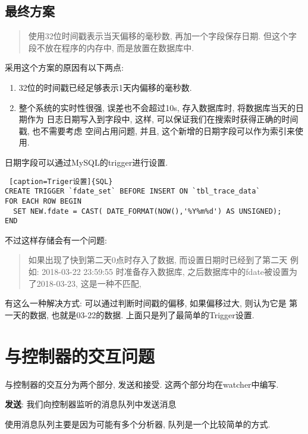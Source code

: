 \subsection{最终方案}

\begin{quote}
使用32位时间戳表示当天偏移的毫秒数, 再加一个字段保存日期.
但这个字段不放在程序的内存中, 而是放置在数据库中.
\end{quote}

采用这个方案的原因有以下两点:

\begin{enumerate}
\def\labelenumi{\arabic{enumi}.}
\item
  32位的时间戳已经足够表示1天内偏移的毫秒数.
\item
  整个系统的实时性很强, 误差也不会超过10s, 存入数据库时,
  将数据库当天的日期作为 日志日期写入到字段中, 这样,
  可以保证我们在搜索时获得正确的时间戳, 也不需要考虑 空间占用问题, 并且,
  这个新增的日期字段可以作为索引来使用.
\end{enumerate}

日期字段可以通过MySQL的trigger进行设置.


\begin{lstlisting} [caption=Triger设置]{SQL}
CREATE TRIGGER `fdate_set` BEFORE INSERT ON `tbl_trace_data`
FOR EACH ROW BEGIN
  SET NEW.fdate = CAST( DATE_FORMAT(NOW(),'%Y%m%d') AS UNSIGNED);
END
\end{lstlisting}


不过这样存储会有一个问题:

\begin{quote}
如果出现了快到第二天0点时存入了数据, 而设置日期时已经到了第二天 例如:
2018-03-22 23:59:55 时准备存入数据库,
之后数据库中的fdate被设置为了2018-03-23, 这是一种不匹配,
\end{quote}

有这么一种解决方式: 可以通过判断时间戳的偏移, 如果偏移过大, 则认为它是
第一天的数据, 也就是03-22的数据. 上面只是列了最简单的Trigger设置.

\section{与控制器的交互问题}

与控制器的交互分为两个部分, 发送和接受. 这两个部分均在watcher中编写.

\textbf{发送}: 我们向控制器监听的消息队列中发送消息

使用消息队列主要是因为可能有多个分析器, 队列是一个比较简单的方式.

